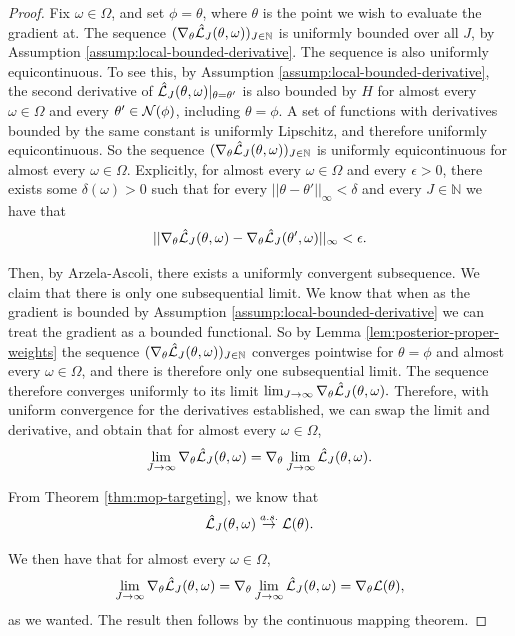 \documentclass{article}
\begin{document}
\begin{proof}
    Fix $\omega \in \Omega$, and set $\phi = \theta$, where $\theta$ is the point we wish to evaluate the gradient at. The sequence $(\nabla_\theta \hat{\mathcal{L}}_J(\theta, \omega))_{J \in \mathbb{N}}$ is uniformly bounded over all $J$, by Assumption \ref{assump:local-bounded-derivative}. The sequence is also uniformly equicontinuous. To see this, by Assumption \ref{assump:local-bounded-derivative}, the second derivative of $\hat{\mathcal{L}}_J(\theta, \omega)|_{\theta=\theta'}$ is also bounded by $H$ for almost every $\omega\in \Omega$ and every $\theta' \in {\mathcal{N}}(\phi)$, including $\theta=\phi$. A set of functions with derivatives bounded by the same constant is uniformly Lipschitz, and therefore uniformly equicontinuous. So the sequence $(\nabla_\theta \hat{\mathcal{L}}_J(\theta, \omega))_{J \in \mathbb{N}}$ is uniformly equicontinuous for almost every $\omega \in \Omega$. 
    Explicitly, for almost every $\omega \in \Omega$ and every $\epsilon>0$, there exists some $\delta(\omega)>0$ such that for every $||\theta - \theta'||_{\infty}<\delta$ and every $J \in \mathbb{N}$ we have that
    $$||\nabla_\theta \hat{\mathcal{L}}_J(\theta, \omega)-\nabla_\theta \hat{\mathcal{L}}_J(\theta', \omega)||_\infty < \epsilon.$$


    Then, by Arzela-Ascoli, there exists a uniformly convergent subsequence. We claim that there is only one subsequential limit. We know that when as the gradient is bounded by Assumption \ref{assump:local-bounded-derivative} we can treat the gradient as a bounded functional. So by Lemma \ref{lem:posterior-proper-weights} the sequence $(\nabla_\theta \hat{\mathcal{L}}_J(\theta, \omega))_{J \in \mathbb{N}}$ converges pointwise for $\theta=\phi$ and almost every $\omega \in \Omega$, and there is therefore only one subsequential limit. The sequence therefore converges uniformly to its limit $\lim_{J \to \infty} \nabla_\theta \hat{\mathcal{L}}_J(\theta, \omega).$ Therefore, with uniform convergence for the derivatives established, we can swap the limit and derivative, and obtain that for almost every $\omega \in \Omega$, 
    $$\lim_{J \to \infty} \nabla_\theta \hat{\mathcal{L}}_J(\theta, \omega) = \nabla_\theta \lim_{J \to \infty} \hat{\mathcal{L}}_J(\theta, \omega).$$

    From Theorem \ref{thm:mop-targeting}, we know that
    $$\hat{\mathcal{L}}_J(\theta, \omega) \stackrel{a.s.}{\to} \mathcal{L}(\theta).$$

    We then have that for almost every $\omega \in \Omega$, 
    $$\lim_{J \to \infty} \nabla_\theta \hat{\mathcal{L}}_J(\theta, \omega) = \nabla_\theta \lim_{J \to \infty} \hat{\mathcal{L}}_J(\theta, \omega) = \nabla_\theta \mathcal{L}(\theta),$$
    as we wanted. The result then follows by the continuous mapping theorem. 
\end{proof}
\end{document}
